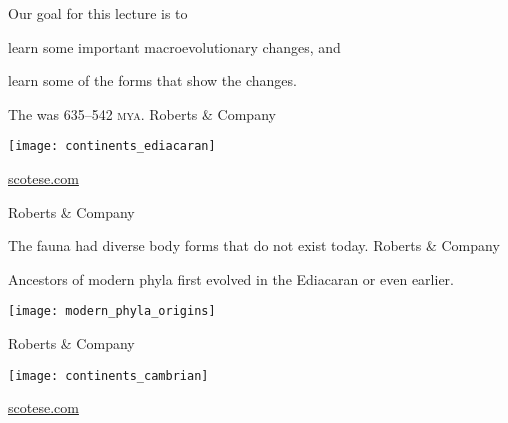 \documentclass[t]{beamer}
\begin{document}

\begin{frame}{Our goal for this lecture is to}
	
	\hangpara learn some important macroevolutionary changes, and
	
	\hangpara learn some of the  forms that show the changes.

\end{frame}
%
{
\begin{frame}[b]{The  was 635--542 \textsc{mya}.}
\hfill \tiny \textcopyright Roberts \& Company
\end{frame}
}
%
{
\begin{frame}[t]
	\texttt{[image: continents\_ediacaran]}
	
	\vfilll
	
	\hfill \tiny \textcolor{white}{\href{http://scotese.com}{scotese.com}}
\end{frame}
}
%

{
\begin{frame}[b]
\hfill \tiny \textcopyright Roberts \& Company
\end{frame}
}
%
{
\begin{frame}[b]{The fauna had diverse body forms that do not exist today.}
\hfill \tiny \textcopyright Roberts \& Company
\end{frame}
}
%
\begin{frame}{Ancestors of modern phyla first evolved in the Ediacaran or even earlier. }

	\texttt{[image: modern\_phyla\_origins]}

	\vfilll
	
	\hfill \tiny \textcopyright Roberts \& Company

\end{frame}
%
{
\begin{frame}[t]
	\texttt{[image: continents\_cambrian]}
	
	\vfilll
	
	\hfill \tiny \textcolor{white}{\href{http://scotese.com}{scotese.com}}
\end{frame}
}
%
\end{document}
